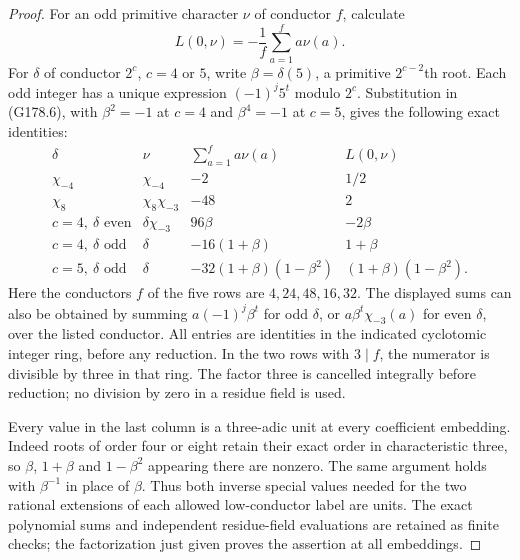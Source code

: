 \begin{proof}
For an odd primitive character $\nu$ of conductor $f$, calculate
\[
                  L(0,\nu)=-\frac1f\sum_{a=1}^{f}a\nu(a).
 \tag{G178.6}
\]
For $\delta$ of conductor $2^c$, $c=4$ or $5$, write
$\beta=\delta(5)$, a primitive $2^{c-2}$th root.  Each odd integer
has a unique expression $(-1)^j5^t$ modulo $2^c$.
Substitution in (G178.6), with $\beta^2=-1$ at $c=4$ and
$\beta^4=-1$ at $c=5$, gives the following exact identities:
\[
 \begin{array}{c|c|c|c}
 \delta&\nu&\sum_{a=1}^{f}a\nu(a)&L(0,\nu)\\ \hline
 \chi_{-4}&\chi_{-4}&-2&1/2\\
 \chi_8&\chi_8\chi_{-3}&-48&2\\
 c=4,\ \delta\text{ even}&\delta\chi_{-3}&96\beta&-2\beta\\
 c=4,\ \delta\text{ odd}&\delta&-16(1+\beta)&1+\beta\\
 c=5,\ \delta\text{ odd}&\delta&
       -32(1+\beta)(1-\beta^2)&(1+\beta)(1-\beta^2).
 \end{array}\tag{G178.7}
\]
Here the conductors $f$ of the five rows are $4,24,48,16,32$.
The displayed sums can also be obtained by summing
$a(-1)^{j}\beta^t$ for odd $\delta$, or
$a\beta^t\chi_{-3}(a)$ for even $\delta$, over the listed conductor.
All entries are identities in the indicated cyclotomic integer ring,
before any reduction.
In the two rows with $3\mid f$, the numerator is divisible by three
in that ring.  The factor three is cancelled integrally before reduction;
no division by zero in a residue field is used.

Every value in the last column is a three-adic unit at every
coefficient embedding.  Indeed roots of order four or eight retain
their exact order in characteristic three, so $\beta$, $1+\beta$ and
$1-\beta^2$ appearing there are nonzero.  The same argument holds
with $\beta^{-1}$ in place of $\beta$.
Thus both inverse special values needed for the two rational
extensions of each allowed low-conductor label are units.
The exact polynomial sums and independent residue-field evaluations
are retained as finite checks; the factorization just given proves
the assertion at all embeddings.


\end{proof}
